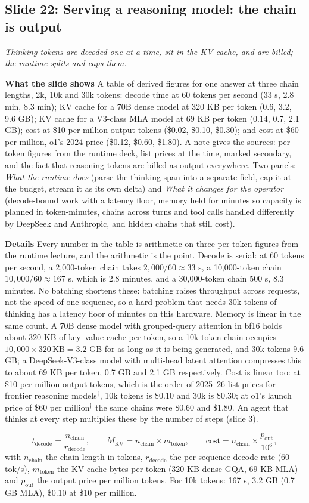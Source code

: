 \documentclass[11pt,letterpaper]{article}
\newcommand{\slide}[3]{%
  \subsection[Slide #1: #2]{Slide #1: #2}%
  {\color{muted}\itshape #3\par}\medskip}
\newcommand{\para}[1]{\medskip\noindent\textbf{#1}\quad}
\newenvironment{formulas}{\begin{tcolorbox}[formulabox]}{\end{tcolorbox}}
\begin{document}
\slide{22}{Serving a reasoning model: the chain is output}{Thinking tokens are decoded one at a time, sit in the KV cache, and are billed; the runtime splits and caps them.}

\para{What the slide shows} A table of derived figures for one answer at three chain lengths, 2k, 10k and 30k tokens: decode time at 60 tokens per second (33 s, 2.8 min, 8.3 min); KV cache for a 70B dense model at 320 KB per token (0.6, 3.2, 9.6 GB); KV cache for a V3-class MLA model at 69 KB per token (0.14, 0.7, 2.1 GB); cost at \$10 per million output tokens (\$0.02, \$0.10, \$0.30); and cost at \$60 per million, o1's 2024 price (\$0.12, \$0.60, \$1.80). A note gives the sources: per-token figures from the runtime deck, list prices at the time, marked secondary, and the fact that reasoning tokens are billed as output everywhere. Two panels: \emph{What the runtime does} (parse the thinking span into a separate field, cap it at the budget, stream it as its own delta) and \emph{What it changes for the operator} (decode-bound work with a latency floor, memory held for minutes so capacity is planned in token-minutes, chains across turns and tool calls handled differently by DeepSeek and Anthropic, and hidden chains that still cost).

\para{Details} Every number in the table is arithmetic on three per-token figures from the runtime lecture, and the arithmetic is the point. Decode is serial: at 60 tokens per second, a 2,000-token chain takes $2{,}000/60\approx33$ s, a 10,000-token chain $10{,}000/60\approx167$ s, which is 2.8 minutes, and a 30,000-token chain $500$ s, 8.3 minutes. No batching shortens these: batching raises throughput across requests, not the speed of one sequence, so a hard problem that needs 30k tokens of thinking has a latency floor of minutes on this hardware. Memory is linear in the same count. A 70B dense model with grouped-query attention in bf16 holds about 320 KB of key--value cache per token, so a 10k-token chain occupies $10{,}000\times320\,\text{KB}=3.2$ GB for as long as it is being generated, and 30k tokens 9.6 GB; a DeepSeek-V3-class model with multi-head latent attention compresses this to about 69 KB per token, 0.7 GB and 2.1 GB respectively. Cost is linear too: at \$10 per million output tokens, which is the order of 2025--26 list prices for frontier reasoning models$^\dagger$, 10k tokens is \$0.10 and 30k is \$0.30; at o1's launch price of \$60 per million$^\dagger$ the same chains were \$0.60 and \$1.80. An agent that thinks at every step multiplies these by the number of steps (slide 3).
\begin{formulas}
\[
t_{\text{decode}}=\frac{n_{\text{chain}}}{r_{\text{decode}}},\qquad
M_{\text{KV}}=n_{\text{chain}}\times m_{\text{token}},\qquad
\text{cost}=n_{\text{chain}}\times\frac{p_{\text{out}}}{10^{6}},
\]
with $n_{\text{chain}}$ the chain length in tokens, $r_{\text{decode}}$ the per-sequence decode rate (60 tok/s), $m_{\text{token}}$ the KV-cache bytes per token (320 KB dense GQA, 69 KB MLA) and $p_{\text{out}}$ the output price per million tokens. For 10k tokens: 167 s, 3.2 GB (0.7 GB MLA), \$0.10 at \$10 per million.
\end{formulas}
\end{document}
